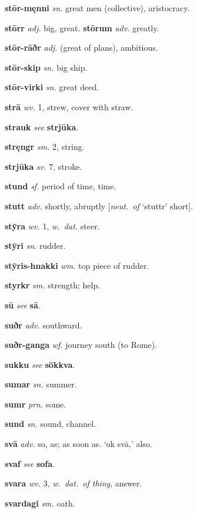 \documentclass[12pt,letterpaper]{book}
\begin{document}
\noindent
\textbf{stōr-męnni} \textit{sn.} great men (collective), aristocracy.

\noindent
\textbf{stōrr} \textit{adj.} big, great.  \textbf{stōrum} \textit{adv.} greatly.

\noindent
\textbf{stōr-rāðr} \textit{adj.} (great of plans), ambitious.

\noindent
\textbf{stōr-skip} \textit{sn.} big ship.

\noindent
\textbf{stōr-virki} \textit{sn.} great deed.

\noindent
\textbf{strā} \textit{wv.} 1, strew, cover with straw.

\noindent
\textbf{strauk} \textit{} \textit{see} \textbf{strjūka}.

\noindent
\textbf{stręngr} \textit{sm.} 2, string.

\noindent
\textbf{strjūka} \textit{sv.} 7, stroke.

\noindent
\textbf{stund} \textit{sf.} period of time, time.

\noindent
\textbf{stutt} \textit{adv.} shortly, abruptly [\textit{neut.\ of} `stuttr'
	short].

\noindent
\textbf{stȳra} \textit{wv.} 1, \textit{w.\ dat.} steer.

\noindent
\textbf{stȳri} \textit{sn.} rudder.

\noindent
\textbf{stȳris-hnakki} \textit{wm.} top piece of rudder.

\noindent
\textbf{styrkr} \textit{sm.} strength; help.

\noindent
\textbf{sū} \textit{} \textit{see} \textbf{sā}.

\noindent
\textbf{suðr} \textit{adv.} southward.

\noindent
\textbf{suðr-ganga} \textit{wf.} journey south (to Rome).

\noindent
\textbf{sukku} \textit{} \textit{see} \textbf{sökkva}.

\noindent
\textbf{sumar} \textit{sn.} summer.

\noindent
\textbf{sumr} \textit{prn.} some.

\noindent
\textbf{sund} \textit{sn.} sound, channel.

\noindent
\textbf{svā} \textit{adv.} so, as; as soon as.  `ok svā,' also.

\noindent
\textbf{svaf} \textit{} \textit{see} \textbf{sofa}.

\noindent
\textbf{svara} \textit{wv.} 3, \textit{w.\ dat.\ of thing}, answer.

\noindent
\textbf{svardagi} \textit{sm.} oath.
\end{document}
